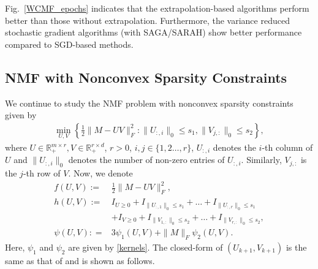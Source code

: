 \documentclass[letterpaper]{article} %
\begin{document}
	Fig.~\ref{WCMF_epochs} indicates that the extrapolation-based algorithms perform better than those without extrapolation. %
	Furthermore, the variance reduced stochastic gradient algorithms (with SAGA/SARAH) show better performance compared to SGD-based methods.
	
	
	
	\subsection{NMF with Nonconvex Sparsity Constraints}
	We continue to study the NMF problem with nonconvex sparsity constraints given by 
	\begin{eqnarray}
		\min_{U,V} \left\{\frac{1}{2}\|M-UV\|_{F}^{2}: \|U_{:,i}\|_{0}\le s_{1}, \|V_{j,:}\|_{0}\le s_{2}\right\}, \label{SSNMF}
	\end{eqnarray}
	where $U\in\mathbb{R}^{m\times r}_{+},V\in\mathbb{R}^{r\times d}_{+}$, $r>0$, $i,j\in\{1,2\dots,r\}$, $U_{:,i}$ denotes the $i$-th column of $U$ and $\|U_{:,i}\|_{0}$ denotes the number of non-zero entries of $U_{:,i}$. Similarly,  $V_{j,:}$ is the $j$-th row of $V$. Now, we denote 
	\begin{align*}
		f(U,V):=&\frac{1}{2}\|M-UV\|_{F}^{2},\\
		h(U,V):=&I_{U\ge0}+I_{\|U_{:,1}\|_{0}\le s_{1}}+\dots+I_{\|U_{:,r}\|_{0}\le s_{1}}\\&+I_{V\ge 0}+I_{\|V_{1,:}\|_{0}\le s_{2}}+\dots+I_{\|V_{r,:}\|_{0}\le s_{2}},\\
		\psi(U,V): =&3\psi_{1}(U,V)+\|M\|_{F}\psi_{2}(U,V).
	\end{align*}
	Here, $\psi_1$ and $\psi_2$ are given by \eqref{kernels}. 
	The closed-form of $(U_{k+1},V_{k+1})$   is the same as that of   \cite[Proposition D.8]{MukkamalaO19} and is shown as follows. 
	
\end{document}
